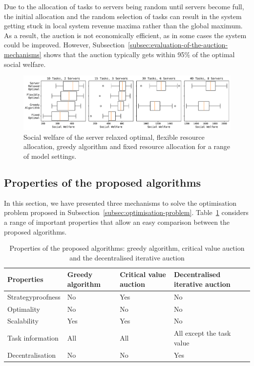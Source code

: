 Due to the allocation of tasks to servers being random until servers become full, the initial allocation and the random selection of tasks can result in the system getting stuck in local system revenue maxima rather than the global maximum. As a result, the auction is not economically efficient, as in some cases the system could be improved. However,  Subsection~\ref{subsec:evaluation-of-the-auction-mechanisms} shows that the auction typically gets within 95\% of the optimal social welfare.

\begin{figure}[bp]
    \centering
    \includegraphics[width=\textwidth]{figs/greedy/social_welfare.pdf}
    \caption{Social welfare of the server relaxed optimal, flexible resource allocation, greedy algorithm and fixed resource allocation for a range of model settings.}
    \label{fig:greedy-algorithm-comparison}
\end{figure}

\subsection{Properties of the proposed algorithms}
In this section, we have presented three mechanisms to solve the optimisation problem proposed in Subsection~\ref{subsec:optimisation-problem}. Table~\ref{tab:algorithms-properties} considers a range of important properties that allow an easy comparison between the proposed algorithms.

\label{subsec:proposed-algorithms-properties}
\begin{table}[H]
    \caption{Properties of the proposed algorithms: greedy algorithm, critical value auction and the
             decentralised iterative auction}
    \label{tab:algorithms-properties}
    \begin{tabular}{|p{2.25cm}|p{1.5cm}|p{1.25cm}|p{2cm}|}
        \hline
        \textbf{Properties} & Greedy algorithm & Critical value auction & Decentralised iterative auction \\ \hline
        Strategyproofness & No & Yes & No \\ \hline
        Optimality & No  & No & No \\ \hline
        Scalability & Yes & Yes & No \\ \hline
        Task information & All & All & All except the task value \\ \hline
        Decentralisation & No  & No  & Yes \\ \hline
    \end{tabular}
\end{table}